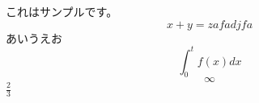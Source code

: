 \documentclass{jarticle}
\begin{document}
これはサンプルです。
\begin{equation}
    x + y = zafadjfa
\end{equation}
あいうえお
$$
\int_0^t f(x) dx
$$
\[
    \infty
\]
$\frac{2}{3}$
\end{document}
